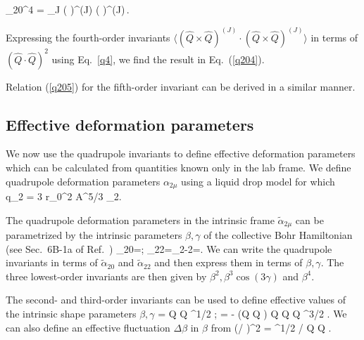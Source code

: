 \documentclass[prc,twocolumn,aps,showpacs,floatfix,nofootinbib,letterpaper,preprintnumbers]{revtex4-1}
\newcommand{\cg}[6]{(#1 \, #2 \,\, #3 \, #4|#5 \, #6)}
\begin{document}
\be
  \langle {}_{20}^4 \rangle = \sum_{J} \frac{\cg{2}{0}{2}{0}{J}{0}^2}{2J+1} \langle ( \times {})^{(J)} \cdot ( \times {})^{(J)}\rangle \,.
\ee

Expressing the fourth-order invariants $\langle (\hat{Q} \times \hat{Q})^{(J)} \cdot (\hat{Q} \times \hat{Q})^{(J)}\rangle$ in terms of $(\hat Q \cdot \hat Q)^2$ using Eq.~\eqref{q4}, we find the result in Eq.~(\ref{q204}).  

Relation (\ref{q205}) for the fifth-order invariant can be derived in a similar manner. 


\subsection{Effective deformation parameters}

We now use the quadrupole invariants to define effective deformation parameters which can be calculated from quantities known only in the lab frame.
We define quadrupole deformation parameters $\alpha_{2\mu} $ using a liquid drop model for which~\cite{ri80}
\be
q_{2\mu} =  3 r_0^2 A^{5/3} \alpha_{2\mu}\;.
\ee

The quadrupole deformation parameters in the intrinsic frame $\tilde\alpha_{2\mu}$ can be parametrized by the intrinsic parameters $\beta,\gamma$ of the collective Bohr Hamiltonian (see Sec.~6B-1a of Ref.~\cite{BM75})
\be
{\tilde\alpha}_{20}=\beta\cos \gamma \;;\;\;  {\tilde\alpha}_{22}={\tilde\alpha}_{2-2}=\beta\sin\gamma\;.
\ee
We can write the quadrupole invariants in terms of ${\tilde\alpha}_{20}$ and ${\tilde\alpha}_{22}$ and then express them in terms of $\beta, \gamma$.  The three lowest-order invariants are then given by $\beta^2, \beta^3\cos (3\gamma)$ and $\beta^4$. 

The second- and third-order invariants can be used to define effective values of the intrinsic
shape parameters $\beta,\gamma$
\be\label{effective_bc}
\beta =  \langle \hat Q \cdot \hat Q \rangle^{1/2}  \;;\;\;
\gamma = - {\langle (\hat Q \times \hat Q ) \cdot \hat Q \rangle \over  \langle \hat Q \cdot \hat Q \rangle^{3/2} } \;.
\ee
We can also define an effective  fluctuation $\Delta \beta$ in $\beta$ from
\be\label{effective_db}
\left({\Delta \beta / \beta}\right)^2 =  {^{1/2} / \langle \hat Q \cdot \hat Q \rangle} \;.
\ee
\end{document}
